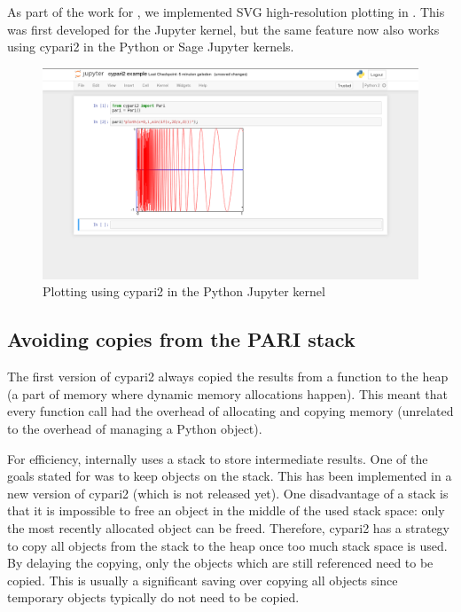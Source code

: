 \documentclass{deliverablereport}
\begin{document}
As part of the work for ,
we implemented SVG high-resolution plotting in \Pari.
This was first developed for the \PariGP Jupyter kernel,
but the same feature now also works using cypari2
in the Python or Sage Jupyter kernels.

\begin{figure}[ht]
  \includegraphics[width=\textwidth,trim={60px 100px 60px 1px},clip]{jupyter-cypari2.png}
  \caption{Plotting using cypari2 in the Python Jupyter kernel}
\end{figure}

\subsection{Avoiding copies from the PARI stack}

The first version of cypari2 always copied the results from a
\PariGP function to the heap
(a part of memory where dynamic memory allocations happen).
This meant that every function call had the overhead
of allocating and copying memory
(unrelated to the overhead of managing a Python object).

For efficiency, \Pari internally uses a stack to store intermediate results.
One of the goals stated for  was to
keep objects on the \Pari stack.
This has been implemented in a new version of cypari2 (which is not released yet).
One disadvantage of a stack is that it is impossible
to free an object in the middle of the used stack space:
only the most recently allocated object can be freed.
Therefore, cypari2 has a strategy to copy all objects
from the stack to the heap once too much stack space is used.
By delaying the copying, only the objects which are still referenced
need to be copied.
This is usually a significant saving over copying all objects
since temporary objects typically do not need to be copied.
\end{document}
